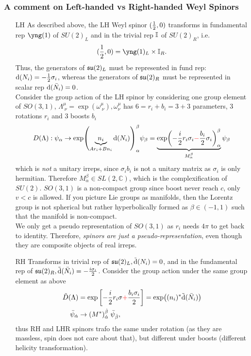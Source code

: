 \subsubsection{A comment on Left-handed vs Right-handed Weyl Spinors}
\label{subsubsec:lhrhSpinors}
\begin{enumerate} 
	\item[LH]
As described above, the LH Weyl spinor $(\frac{1}{2},0)$ transforms in fundamental rep $\yng(1)$ of $SU(2)_L$ and in the trivial rep $\mathbb{I}$ of $SU(2)_R$, i.e.
\begin{equation*}
	(\half,0)=\yng(1)_L \times \mI_R.
\end{equation*}
Thus, the generators of $\mathfrak{su}(2)_L$ must be represented in fund rep: $\mathrm{d}(N_i)=-\frac{1}{2} \sigma_i$, whereas the generators of $\mathfrak{su}(2)_R$ must be represented in scalar rep $\mathrm{d}(\bar{ N}_i)=0$. \\
Consider the group action of the LH spinor by considering one group element of $SO(3,1)$, $\Lambda^\mu_{\;\nu}=\exp(\omega^\mu_{\;\nu}), \omega^\mu_\nu$ has $6=r_i+b_i=3+3$ parameters, $3$ rotations $r_i$ and $3$ boosts $b_i$
\begin{equation*}
	D(\Lambda): \psi_\alpha \rightarrow \exp(\underbrace{n_i}_{Ar_i+Bn_i} \mathrm{d}(N_i))^\beta_\alpha \psi_\beta = \underbrace{\exp(-\frac{i}{2} r_i \sigma_i \textcolor{red}{-} \frac{b_i}{2}\sigma_i)^\beta_\alpha}_{M^\beta_\alpha}\psi_\beta
\end{equation*}
which is \emph{not} a unitary irreps, since $\sigma_i b_i$ is not a unitary matrix as $\sigma_i$ is only hermitian. Therefore $M^\beta_\alpha \in SL(2,\mathbb{C})$, which is the complexification of $SU(2)$. $SO(3,1)$ is a non-compact group since boost never reach $c$, only $v<c$ is allowed. If you picture Lie groups as manifolds, then the Lorentz group is not spherical but rather hyperbolically formed as $\beta \in (-1,1)$ such that the manifold is non-compact.\\
We only get a pseudo representation of $SO(3,1)$ as $r_i$ needs $4\pi$ to get back to identity. Therefore, \emph{spinors are just a pseudo-representation}, even though they are composite objects of real irreps.
\item[RH] Transforms in trivial rep of $\mathfrak{su}(2)_L, \tilde{\mathrm{d}}(N_i)=0$, and in the fundamental rep of $\mathfrak{su}(2)_R, \tilde{\mathrm{d}}( \bar{ N}_i)= - \frac{i\sigma_i}{2}$. Consider the group action under the same group element as above
\begin{align*}
	\tilde{D}(\Lambda)&=\exp\left[-\frac{i}{2} r_i \sigma \textcolor{red}{+} \frac{b_i\sigma_i}{2} \right] = \exp((n_i)^* \tilde{\mathrm{d}}(\bar{ N}_i))\\
	\bar{ \psi}_{\dot{\alpha}} &\rightarrow (M^*)^{\dot{\beta}}_{\dot{\alpha}}   \; \bar{ \psi}_{\dot{\beta}},
\end{align*}
thus RH and LHR spinors trafo the same under rotation (as they are massless, spin does not care about that), but different under boosts (different helicity transformation).
\end{enumerate}
